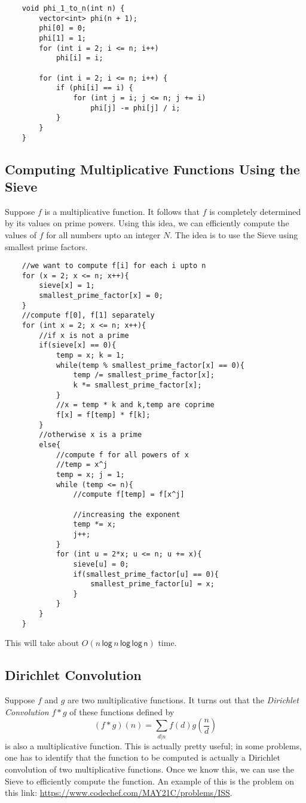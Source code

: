 \documentclass[12pt,a4paper]{amsart}
\numberwithin{equation}{section}
\theoremstyle{definition}
\begin{document}
\begin{lstlisting}
    void phi_1_to_n(int n) {
        vector<int> phi(n + 1);
        phi[0] = 0;
        phi[1] = 1;
        for (int i = 2; i <= n; i++)
            phi[i] = i;

        for (int i = 2; i <= n; i++) {
            if (phi[i] == i) {
                for (int j = i; j <= n; j += i)
                    phi[j] -= phi[j] / i;
            }
        }
    }
\end{lstlisting}

\subsection{Computing Multiplicative Functions Using the Sieve} Suppose $f$ is a multiplicative function. It follows that $f$ is completely determined by its values on prime powers. Using this idea, we can efficiently compute the values of $f$ for all numbers upto an integer $N$. The idea is to use the Sieve using smallest prime factors. 

\begin{lstlisting}
    //we want to compute f[i] for each i upto n
    for (x = 2; x <= n; x++){
        sieve[x] = 1;
        smallest_prime_factor[x] = 0;
    }
    //compute f[0], f[1] separately
    for (int x = 2; x <= n; x++){
        //if x is not a prime
        if(sieve[x] == 0){
            temp = x; k = 1;
            while(temp % smallest_prime_factor[x] == 0){
                temp /= smallest_prime_factor[x];
                k *= smallest_prime_factor[x];
            }
            //x = temp * k and k,temp are coprime
            f[x] = f[temp] * f[k];
        }
        //otherwise x is a prime
        else{
            //compute f for all powers of x
            //temp = x^j
            temp = x; j = 1;
            while (temp <= n){
                //compute f[temp] = f[x^j]
                
                //increasing the exponent
                temp *= x;
                j++;
            }
            for (int u = 2*x; u <= n; u += x){
                sieve[u] = 0;
                if(smallest_prime_factor[u] == 0){
                    smallest_prime_factor[u] = x;
                }
            }
        }
    }    
\end{lstlisting}

This will take about $O(n\,\mathsf{log\,}n\,\mathsf{log\,log\,n})$ time. 

\subsection{Dirichlet Convolution} Suppose $f$ and $g$ are two multiplicative functions. It turns out that the \textit{Dirichlet Convolution} $f*g$ of these functions defined by 
$$(f*g)(n) = \sum_{d|n}f(d)g\left(\dfrac{n}{d}\right)$$
is also a multiplicative function. This is actually pretty useful; in some problems, one has to identify that the function to be computed is actually a Dirichlet convolution of two multiplicative functions. Once we know this, we can use the Sieve to efficiently compute the function. An example of this is the problem on this link: \url{https://www.codechef.com/MAY21C/problems/ISS}.
\end{document}
